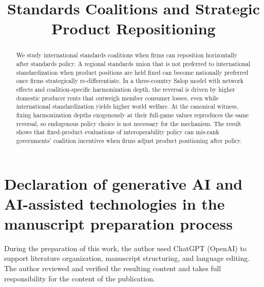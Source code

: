 \documentclass[11pt]{article}
\title{Standards Coalitions and Strategic Product Repositioning}
\author{}
\date{}
\begin{document}
\maketitle
\begin{abstract}
We study international standards coalitions when firms can reposition horizontally after standards policy. A regional standards union that is not preferred to international standardization when product positions are held fixed can become nationally preferred once firms strategically re-differentiate. In a three-country Salop model with network effects and coalition-specific harmonization depth, the reversal is driven by higher domestic producer rents that outweigh member consumer losses, even while international standardization yields higher world welfare. At the canonical witness, fixing harmonization depths exogenously at their full-game values reproduces the same reversal, so endogenous policy choice is not necessary for the mechanism. The result shows that fixed-product evaluations of interoperability policy can mis-rank governments' coalition incentives when firms adjust product positioning after policy.
\end{abstract}









\appendix


\section*{Declaration of generative AI and AI-assisted technologies in the manuscript preparation process}
During the preparation of this work, the author used ChatGPT (OpenAI) to support literature organization, manuscript structuring, and language editing. The author reviewed and verified the resulting content and takes full responsibility for the content of the publication.



\end{document}
